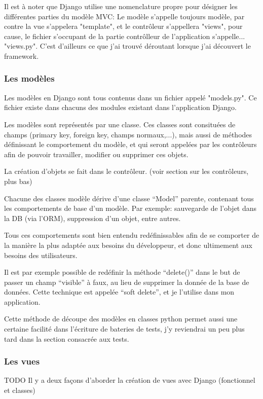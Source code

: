 \documentclass[12pt,table,a4paper]{report}
\begin{document}
Il est à noter que Django utilise une nomenclature propre pour désigner les différentes parties du modèle MVC: Le modèle s'appelle toujours modèle, par contre la vue s'appelera "template", et le contrôleur s'appellera "views", pour cause, le fichier s'occupant de la partie contrôlleur de l'application s'appelle... "views.py". C'est d'ailleurs ce que j'ai trouvé déroutant lorsque j'ai découvert le framework.

\subsubsection{Les modèles}
Les modèles en Django sont tous contenus dans un fichier appelé "models.py". Ce fichier existe dans chacuns des modules existant dans l'application Django.

Les modèles sont représentés par une classe. Ces classes sont consituées de champs (primary key, foreign key, champs normaux,...), mais aussi de méthodes définissant le comportement du modèle, et qui seront appelées par les contrôleurs afin de pouvoir travailler, modifier ou supprimer ces objets.

La création d'objets se fait dans le contrôleur. (voir section sur les contrôleurs, plus bas)

Chacune des classes modèle dérive d'une classe "`Model"' parente, contenant tous les comportements de base d'un modèle. Par exemple: sauvegarde de l'objet dans la DB (via l'ORM), suppression d'un objet, entre autres.

Tous ces comportements sont bien entendu redéfinissables afin de se comporter de la manière la plus adaptée aux besoins du développeur, et donc ultimement aux besoins des utilisateurs.

Il est par exemple possible de redéfinir la méthode "`delete()"' dans le but de passer un champ "`visible"' à faux, au lieu de supprimer la donnée de la base de données. Cette technique est appelée "`soft delete"', et je l'utilise dans mon application.

Cette méthode de découpe des modèles en classes python permet aussi une certaine facilité dans l'écriture de bateries de tests, j'y reviendrai un peu plus tard dans la section consacrée aux tests.

\subsubsection{Les vues}
TODO
Il y a deux façons d'aborder la création de vues avec Django (fonctionnel et classes)
\end{document}
